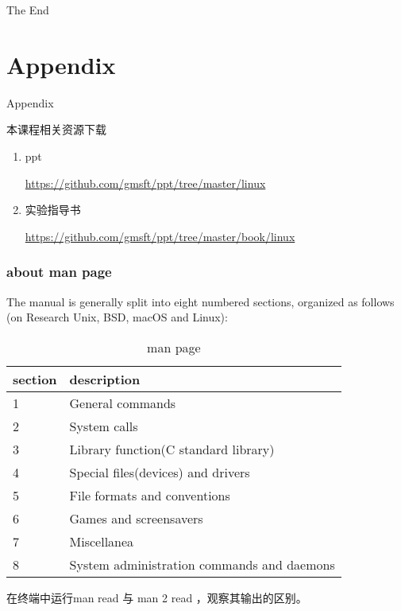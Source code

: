 \documentclass{beamer}
\begin{document}
\begin{frame}
\Huge{\centerline{The End}}
\end{frame}



\section{Appendix}
\begin{frame}
\Huge{\centerline{Appendix}}
\end{frame}
\begin{frame}{本课程相关资源下载}
\begin{enumerate}
\item
ppt

\url{https://github.com/gmsft/ppt/tree/master/linux}
\item
实验指导书

\url{https://github.com/gmsft/ppt/tree/master/book/linux}
\end{enumerate}
\end{frame}
\begin{frame}
\frametitle{about man page}
The manual is generally split into eight numbered sections, organized as follows (on Research Unix, BSD, macOS and Linux):
\begin{table}
\begin{tabular}{ll}
\toprule
\textbf{section} & \textbf{description} \\
\midrule
1 & General commands\\
 2 & System calls\\
 3& Library function(C standard library)\\
 4 & Special files(devices) and drivers\\
  5 & File formats and conventions\\
  6  & Games and screensavers\\
   7  & Miscellanea\\
   8   & System administration commands and daemons\\  
\bottomrule
\end{tabular}
\caption{man page}
\end{table}

在终端中运行man read 与 man 2 read ，观察其输出的区别。
\end{frame}
\end{document}
